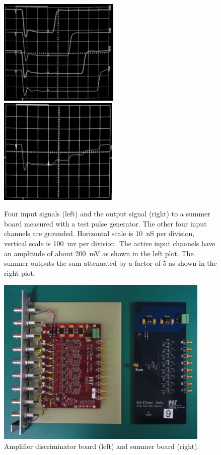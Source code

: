 \documentclass[review,number,sort&compress]{elsarticle}
\begin{document}
\begin{figure}[ht]
	\begin{center}
		\includegraphics[height=2in, keepaspectratio=true]{graphics/sumpulseinput_bw.png}
		\includegraphics[height=2in, keepaspectratio=true]{graphics/sumpulseoutput_bw.png}
		\caption{Four input signals (left) and the output signal (right) to a summer board measured with a test pulse generator. The other four input channels are grounded. Horizontal scale is 10~nS per division, vertical scale is 100~mv per division.  The active input channels have an amplitude of about 200~mV as shown in the left plot.  The summer outputs the sum attenuated by a factor of 5 as shown in the right plot.
		\label{fig:summerpulse}}
	\end{center}
\end{figure}

\begin{figure}[ht]
\begin{center}
\includegraphics[width=4in, keepaspectratio=true]{graphics/boards.JPG}
\caption{Amplifier discriminator board (left) and summer board (right).
\label{fig:boards}}
\end{center}
\end{figure}
\end{document}
